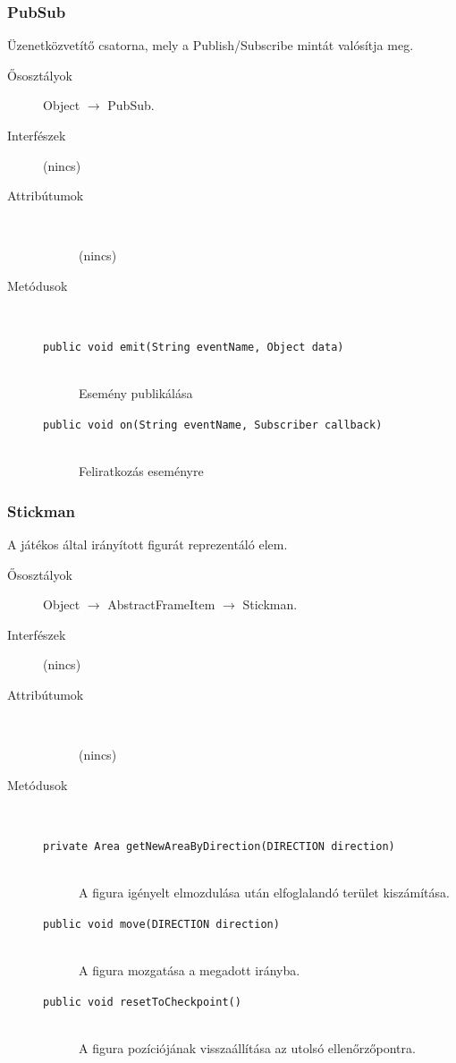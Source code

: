 		\subsubsection{PubSub}
				 Üzenetközvetítő csatorna, mely a Publish/Subscribe mintát valósítja meg. 			\begin{description}


				\item[Ősosztályok] Object $\rightarrow{}$ PubSub.
				\item[Interfészek] (nincs)
				\item[Attribútumok]$\ $
					\begin{description}
						\item[] (nincs)
					\end{description}
				\item[Metódusok]$\ $
					\begin{description}
						\item[\texttt{public void emit(String eventName, Object data)}] \hfill \\ Esemény publikálása 
						\item[\texttt{public void on(String eventName, Subscriber callback)}] \hfill \\ Feliratkozás eseményre 
					\end{description}
			\end{description}

		\subsubsection{Stickman}
				 A játékos által irányított figurát reprezentáló elem. 			\begin{description}


				\item[Ősosztályok] Object $\rightarrow{}$ AbstractFrameItem $\rightarrow{}$ Stickman.
				\item[Interfészek] (nincs)
				\item[Attribútumok]$\ $
					\begin{description}
						\item[] (nincs)
					\end{description}
				\item[Metódusok]$\ $
					\begin{description}
						\item[\texttt{private Area getNewAreaByDirection(DIRECTION direction)}] \hfill \\ A figura igényelt elmozdulása után elfoglalandó  terület kiszámítása. 
						\item[\texttt{public void move(DIRECTION direction)}] \hfill \\ A figura mozgatása a megadott irányba. 
						\item[\texttt{public void resetToCheckpoint()}] \hfill \\ A figura pozíciójának visszaállítása az  utolsó ellenőrzőpontra. 
					\end{description}
			\end{description}

